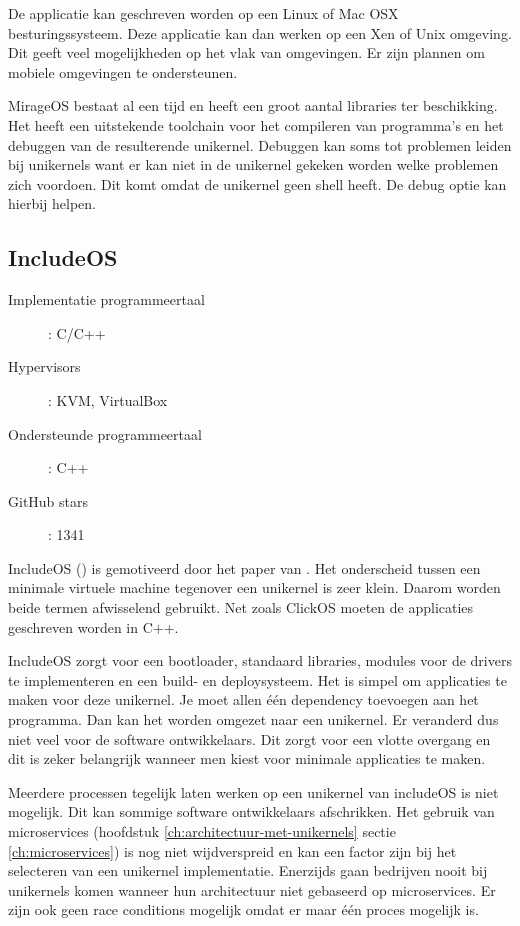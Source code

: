 \documentclass[pdftex,a4paper,12pt,twoside]{report}
\begin{document}
De applicatie kan geschreven worden op een Linux of Mac OSX besturingssysteem. Deze applicatie kan dan werken op een Xen of Unix omgeving. Dit geeft veel mogelijkheden op het vlak van omgevingen. Er zijn plannen om mobiele omgevingen te ondersteunen.

MirageOS bestaat al een tijd en heeft een groot aantal libraries ter beschikking. Het heeft een uitstekende toolchain voor het compileren van programma's en het debuggen van de resulterende unikernel. Debuggen kan soms tot problemen leiden bij unikernels want er kan niet in de unikernel gekeken worden welke problemen zich voordoen. Dit komt omdat de unikernel geen shell heeft. De debug optie kan hierbij helpen.

\subsection{IncludeOS}
\begin{description}
  \item [Implementatie programmeertaal]: C/C++
  \item [Hypervisors]: KVM, VirtualBox
  \item [Ondersteunde programmeertaal]: C++
  \item [GitHub stars]: 1341
\end{description}

IncludeOS (\cite{oslo_and_akershus_university_college_hioa-cs/includeos_????}) is gemotiveerd door het paper van \cite{bratterud_maximizing_2013}. Het onderscheid tussen een minimale virtuele machine tegenover een unikernel is zeer klein. Daarom worden beide termen afwisselend gebruikt. Net zoals ClickOS moeten de applicaties geschreven worden in C++.

IncludeOS zorgt voor een bootloader, standaard libraries, modules voor de drivers te implementeren en een build- en deploysysteem. Het is simpel om applicaties te maken voor deze unikernel. Je moet allen één dependency toevoegen aan het programma. Dan kan het worden omgezet naar een unikernel. Er veranderd dus niet veel voor de software ontwikkelaars. Dit zorgt voor een vlotte overgang en dit is zeker belangrijk wanneer men kiest voor minimale applicaties te maken.

Meerdere processen tegelijk laten werken op een unikernel van includeOS is niet mogelijk. Dit kan sommige software ontwikkelaars afschrikken. Het gebruik van microservices (hoofdstuk \ref{ch:architectuur-met-unikernels} sectie \ref{ch:microservices}) is nog niet wijdverspreid en kan een factor zijn bij het selecteren van een unikernel implementatie. Enerzijds gaan bedrijven nooit bij unikernels komen wanneer hun architectuur niet gebaseerd op microservices. Er zijn ook geen race conditions mogelijk omdat er maar één proces mogelijk is.
\end{document}
